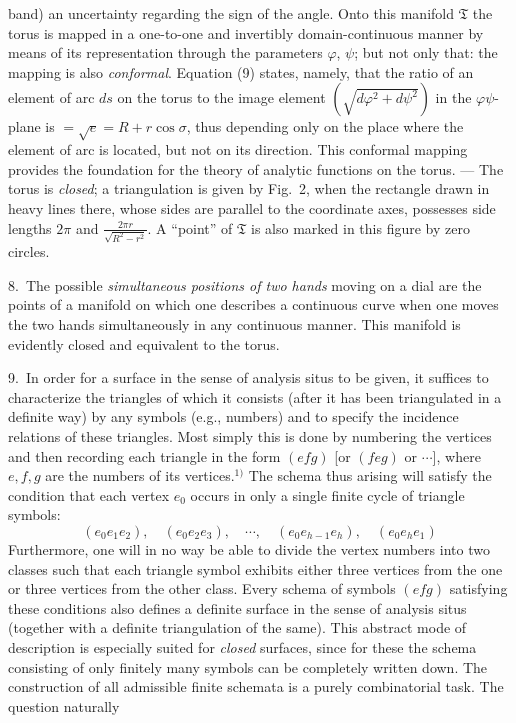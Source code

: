 \documentclass{article}
\begin{document}
band) an uncertainty regarding the sign of the angle. Onto this manifold $\mathfrak{T}$ the torus is mapped in a one-to-one and invertibly domain-continuous manner by means of its representation through the parameters $\varphi$, $\psi$; but not only that: the mapping is also \emph{conformal}. Equation (9) states, namely, that the ratio of an element of arc $ds$ on the torus to the image element $(\sqrt{d\varphi^2 + d\psi^2})$ in the $\varphi\psi$-plane is $= \sqrt{e} = R + r \cos \sigma$, thus depending only on the place where the element of arc is located, but not on its direction. This conformal mapping provides the foundation for the theory of analytic functions on the torus. --- The torus is \emph{closed}; a triangulation is given by Fig.~2, when the rectangle drawn in heavy lines there, whose sides are parallel to the coordinate axes, possesses side lengths $2\pi$ and $\frac{2\pi r}{\sqrt{R^2 - r^2}}$. A ``point'' of $\mathfrak{T}$ is also marked in this figure by zero circles.

8.\ The possible \emph{simultaneous positions of two hands} moving on a dial are the points of a manifold on which one describes a continuous curve when one moves the two hands simultaneously in any continuous manner. This manifold is evidently closed and equivalent to the torus.

9.\ In order for a surface in the sense of analysis situs to be given, it suffices to characterize the triangles of which it consists (after it has been triangulated in a definite way) by any symbols (e.g., numbers) and to specify the incidence relations of these triangles. Most simply this is done by numbering the vertices and then recording each triangle in the form $(efg)$ [or $(feg)$ or $\cdots$], where $e, f, g$ are the numbers of its vertices.${}^{1)}$ The schema thus arising will satisfy the condition that each vertex $e_0$ occurs in only a single finite cycle of triangle symbols:
\[
(e_0 e_1 e_2), \quad (e_0 e_2 e_3), \quad \cdots, \quad (e_0 e_{h-1} e_h), \quad (e_0 e_h e_1)
\]
Furthermore, one will in no way be able to divide the vertex numbers into two classes such that each triangle symbol exhibits either three vertices from the one or three vertices from the other class. Every schema of symbols $(efg)$ satisfying these conditions also defines a definite surface in the sense of analysis situs (together with a definite triangulation of the same). This abstract mode of description is especially suited for \emph{closed} surfaces, since for these the schema consisting of only finitely many symbols can be completely written down. The construction of all admissible finite schemata is a purely combinatorial task. The question naturally
\end{document}
